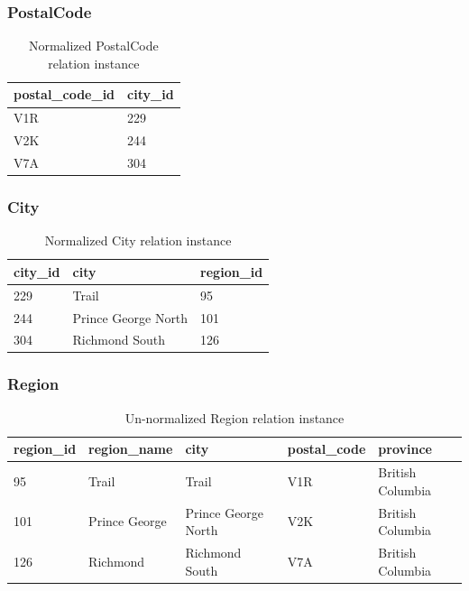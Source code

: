 \documentclass{article}
\begin{document}
\subsubsection{PostalCode}
\begin{table}[H]
\centering
\begin{adjustbox}{width=0.25\textwidth,center=\textwidth}
\begin{tabular}{|l|l|} 
        \hline
        postal\_code\_id & city\_id \\ 
        \hline
        V1R & 229 \\
        V2K & 244 \\
        V7A & 304 \\
        \hline
\end{tabular}
\end{adjustbox}
\caption{Normalized PostalCode relation instance}
\end{table}

\subsubsection{City}
\begin{table}[H]
\centering
\begin{adjustbox}{width=0.35\textwidth,center=\textwidth}
\begin{tabular}{|l|l|l|} 
        \hline
        city\_id & city & region\_id \\ 
        \hline
        229 & Trail & 95 \\
        244 & Prince George North & 101 \\
        304 & Richmond South  & 126\\
        \hline
\end{tabular}
\end{adjustbox}
\caption{Normalized City relation instance}
\end{table}

\subsubsection{Region}
\begin{table}[H]
\centering
\begin{adjustbox}{width=0.45\textwidth,center=\textwidth}
\begin{tabular}{|l|l|l|l|l|} 
        \hline
        region\_id & region\_name & city & postal\_code & province \\ 
        \hline
        95 & Trail & Trail & V1R & British Columbia \\
        101 & Prince George & Prince George North & V2K & British Columbia \\
        126 & Richmond & Richmond South & V7A & British Columbia\\
        \hline
\end{tabular}
\end{adjustbox}
\caption{Un-normalized Region relation instance}
\end{table}
\end{document}
